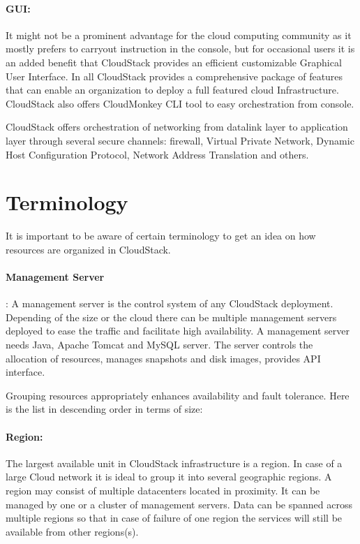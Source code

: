 \paragraph{GUI:} It might not be a prominent advantage for the cloud
computing community as it mostly prefers to carryout instruction in
the console, but for occasional users it is an added benefit that
CloudStack provides an efficient customizable Graphical User
Interface. In all CloudStack provides a comprehensive package of
features that can enable an organization to deploy a full featured
cloud Infrastructure. CloudStack also offers CloudMonkey CLI 
tool to easy orchestration from console.

CloudStack offers orchestration of networking from datalink layer
to application layer through several secure channels:
firewall, Virtual Private Network, Dynamic Host Configuration 
Protocol, Network Address Translation and others.

\section{Terminology}

It is important to be aware of certain terminology to get an idea on
how resources are organized in CloudStack.
\paragraph{Management Server}:
A management server is the control system of any CloudStack deployment. 
Depending of the size or the cloud there can be multiple management 
servers deployed to ease the traffic and facilitate high availability.
A management server needs Java, Apache Tomcat and MySQL server. The server
controls the allocation of resources, manages snapshots and disk images,
provides API interface.



Grouping resources appropriately enhances availability and fault tolerance. Here is the 
list in descending order in terms of size:
\paragraph{Region:}	The largest available unit in CloudStack infrastructure is a 
region. In case of a large Cloud network it is ideal to group it into 
several geographic regions. A region may consist of multiple datacenters
located in proximity. It can be managed by one or a cluster of management
servers. Data can be spanned across multiple regions so that in case of
failure of one region the services will still be available from other regions(s).
